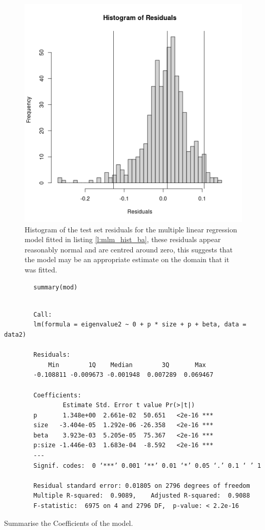 \documentclass[11pt]{report}
\begin{document}
\begin{figure}[htbp]
\centering
\includegraphics[width=12cm]{media/ba_hist_mlm_mod.png}
\caption{\label{fig:mlm_hist_ba}Histogram of the test set residuals for the multiple linear regression model fitted in listing \ref{l:mlm_hist_ba}, these residuals appear reasonably normal and are centred around zero, this suggests that the model may be an appropriate estimate on the domain that it was fitted.}
\end{figure}


\begin{listing}[htbp]
    \begin{tcolorbox}
        \begin{verbatim}
        summary(mod)
        \end{verbatim}
    \tcblower
        \begin{verbatim}

        Call:
        lm(formula = eigenvalue2 ~ 0 + p * size + p + beta, data = data2)

        Residuals:
            Min        1Q    Median        3Q       Max
        -0.108811 -0.009673 -0.001948  0.007289  0.069467

        Coefficients:
                Estimate Std. Error t value Pr(>|t|)
        p       1.348e+00  2.661e-02  50.651   <2e-16 ***
        size   -3.404e-05  1.292e-06 -26.358   <2e-16 ***
        beta    3.923e-03  5.205e-05  75.367   <2e-16 ***
        p:size -1.446e-03  1.683e-04  -8.592   <2e-16 ***
        ---
        Signif. codes:  0 ‘***’ 0.001 ‘**’ 0.01 ‘*’ 0.05 ‘.’ 0.1 ‘ ’ 1

        Residual standard error: 0.01805 on 2796 degrees of freedom
        Multiple R-squared:  0.9089,	Adjusted R-squared:  0.9088
        F-statistic:  6975 on 4 and 2796 DF,  p-value: < 2.2e-16
        \end{verbatim}
    \end{tcolorbox}
\caption{\label{mod_summary}Summarise the Coefficients of the model.}
\end{listing}
\end{document}
